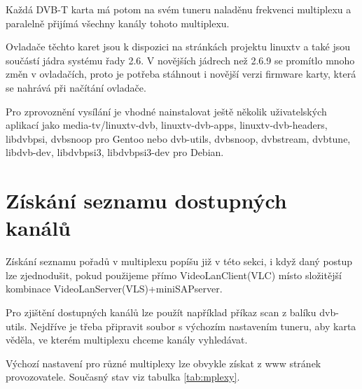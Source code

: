 Každá DVB-T karta má potom na svém tuneru naladěnu frekvenci multiplexu a paralelně přijímá všechny kanály tohoto multiplexu.

Ovladače těchto karet jsou k dispozici na stránkách projektu linuxtv \cite{linuxtvURL} a také jsou součástí jádra systému řady 2.6. V novějších jádrech než 2.6.9 se promítlo mnoho změn v ovladačích, proto je potřeba stáhnout i novější verzi firmware karty, která se nahrává při načítání ovladače.

Pro zprovoznění vysílání je vhodné nainstalovat ještě několik uživatelských aplikací jako media-tv/linuxtv-dvb, linuxtv-dvb-apps, linuxtv-dvb-headers, libdvbpsi, dvbsnoop pro Gentoo nebo dvb-utils, dvbsnoop, dvbstream, dvbtune, libdvb-dev, libdvbpsi3, libdvbpsi3-dev pro Debian.

\section{Získání seznamu dostupných kanálů}

Získání seznamu pořadů v multiplexu popíšu již v této sekci, i když daný postup lze zjednodušit, pokud použijeme přímo VideoLanClient(VLC) místo složitější kombinace VideoLanServer(VLS)+miniSAPserver.

Pro zjištění dostupných kanálů lze použít například příkaz scan z balíku dvb-utils. Nejdříve je třeba připravit soubor s výchozím nastavením tuneru, aby karta věděla, ve kterém multiplexu chceme kanály vyhledávat.

Výchozí nastavení pro různé multiplexy lze obvykle získat z www stránek provozovatele. Současný stav viz tabulka \ref{tab:mplexy}.

